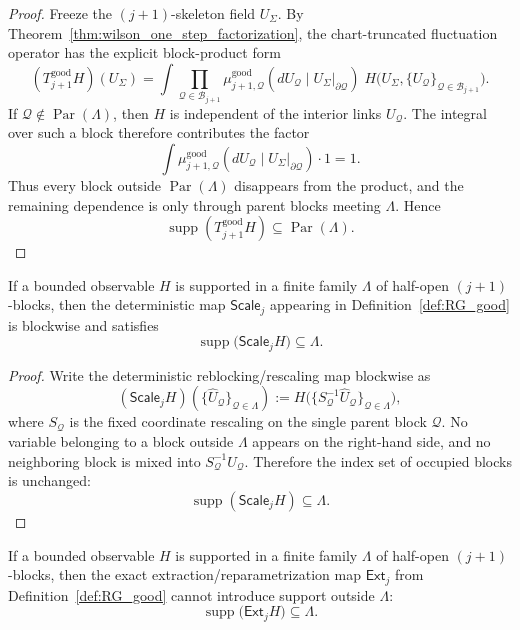 \begin{proof}
Freeze the $(j+1)$-skeleton field $U_{\Sigma}$.
By Theorem~\ref{thm:wilson_one_step_factorization}, the chart-truncated fluctuation operator has the explicit block-product form
\[
(T_{j+1}^{\mathrm{good}}H)(U_{\Sigma})
=
\int \prod_{\mathcal Q\in\mathcal B_{j+1}}\mu^{\mathrm{good}}_{j+1,\mathcal Q}(dU_{\mathcal Q}\mid U_{\Sigma}|_{\partial\mathcal Q})\;H\bigl(U_{\Sigma},\{U_{\mathcal Q}\}_{\mathcal Q\in\mathcal B_{j+1}}\bigr).
\]
If $\mathcal Q\notin \operatorname{Par}(\Lambda)$, then $H$ is independent of the interior links $U_{\mathcal Q}$.
The integral over such a block therefore contributes the factor
\[
\int \mu^{\mathrm{good}}_{j+1,\mathcal Q}(dU_{\mathcal Q}\mid U_{\Sigma}|_{\partial\mathcal Q})\cdot 1 =1.
\]
Thus every block outside $\operatorname{Par}(\Lambda)$ disappears from the product, and the remaining dependence is only through parent blocks meeting $\Lambda$.
Hence
\[
\operatorname{supp}(T_{j+1}^{\mathrm{good}}H)\subseteq \operatorname{Par}(\Lambda).
\]
\end{proof}

\begin{lemma}\label{lem:RGgood_support_scale}
If a bounded observable $H$ is supported in a finite family $\Lambda$ of half-open $(j+1)$-blocks, then the deterministic map $\mathsf{Scale}_j$ appearing in Definition~\ref{def:RG_good} is blockwise and satisfies
\[
\operatorname{supp}\bigl(\mathsf{Scale}_j H\bigr)\subseteq \Lambda.
\]
\end{lemma}

\begin{proof}
Write the deterministic reblocking/rescaling map blockwise as
\[
(\mathsf{Scale}_jH)(\{\widehat U_{\mathcal Q}\}_{\mathcal Q\in\Lambda})
:=
H\bigl(\{S_{\mathcal Q}^{-1}\widehat U_{\mathcal Q}\}_{\mathcal Q\in\Lambda}\bigr),
\]
where $S_{\mathcal Q}$ is the fixed coordinate rescaling on the single parent block $\mathcal Q$.
No variable belonging to a block outside $\Lambda$ appears on the right-hand side, and no neighboring block is mixed into $S_{\mathcal Q}^{-1}\widehat U_{\mathcal Q}$.
Therefore the index set of occupied blocks is unchanged:
\[
\operatorname{supp}(\mathsf{Scale}_jH)\subseteq \Lambda.
\]
\end{proof}

\begin{lemma}\label{lem:RGgood_support_ext}
If a bounded observable $H$ is supported in a finite family $\Lambda$ of half-open $(j+1)$-blocks, then the exact extraction/reparametrization map $\mathsf{Ext}_j$ from Definition~\ref{def:RG_good} cannot introduce support outside $\Lambda$:
\[
\operatorname{supp}\bigl(\mathsf{Ext}_j H\bigr)\subseteq \Lambda.
\]
\end{lemma}

